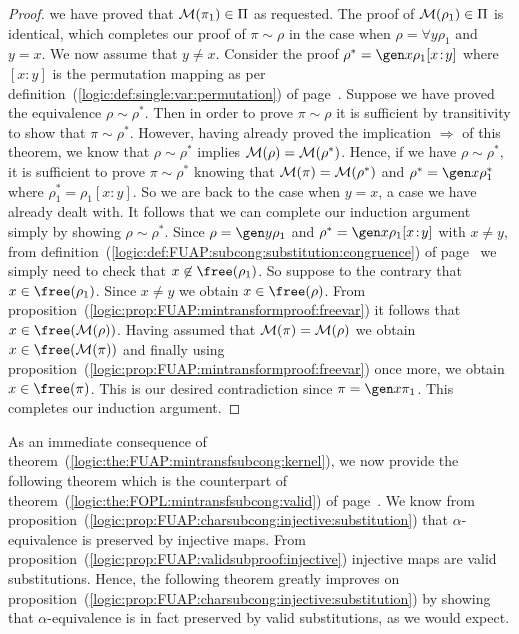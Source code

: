 \begin{proof}
we have proved that ${\cal M}(\pi_{1})\in\Pi$ as requested. The
proof of ${\cal M}(\rho_{1})\in\Pi$ is identical, which completes
our proof of $\pi\sim\rho$ in the case when $\rho=\forall y\rho_{1}$
and $y=x$. We now assume that $y\neq x$. Consider the proof
$\rho^{*}=\gen x\rho_{1}[x\!:\!y]$ where $[x\!:\!y]$ is the
permutation mapping as per
definition~(\ref{logic:def:single:var:permutation}) of
page~\pageref{logic:def:single:var:permutation}. Suppose we have
proved the equivalence $\rho\sim\rho^{*}$. Then in order to prove
$\pi\sim\rho$ it is sufficient by transitivity to show that
$\pi\sim\rho^{*}$. However, having already proved the implication
$\Rightarrow$ of this theorem, we know that $\rho\sim\rho^{*}$
implies ${\cal M}(\rho)={\cal M}(\rho^{*})$. Hence, if we have
$\rho\sim\rho^{*}$, it is sufficient to prove $\pi\sim\rho^{*}$
knowing that ${\cal M}(\pi)={\cal M}(\rho^{*})$ and $\rho^{*}=\gen
x\rho_{1}^{*}$ where $\rho_{1}^{*}=\rho_{1}[x\!:\!y]$. So we are
back to the case when $y=x$, a case we have already dealt with. It
follows that we can complete our induction argument simply by
showing $\rho\sim\rho^{*}$. Since $\rho=\gen y\rho_{1}$ and
$\rho^{*}=\gen x\rho_{1}[x\!:\!y]$ with $x\neq y$, from
definition~(\ref{logic:def:FUAP:subcong:substitution:congruence}) of
page~\pageref{logic:def:FUAP:subcong:substitution:congruence} we
simply need to check that $x\not\in\free(\rho_{1})$. So suppose to
the contrary that $x\in\free(\rho_{1})$. Since $x\neq y$ we obtain
$x\in\free(\rho)$. From
proposition~(\ref{logic:prop:FUAP:mintransformproof:freevar}) it
follows that $x\in\free({\cal M}(\rho))$. Having assumed that ${\cal
M}(\pi)={\cal M}(\rho)$ we obtain $x\in\free({\cal M}(\pi))$ and
finally using
proposition~(\ref{logic:prop:FUAP:mintransformproof:freevar}) once
more, we obtain $x\in\free(\pi)$. This is our desired contradiction
since $\pi=\gen x\pi_{1}$. This completes our induction argument.
\end{proof}

As an immediate consequence of
theorem~(\ref{logic:the:FUAP:mintransfsubcong:kernel}), we now
provide the following theorem which is the counterpart of
theorem~(\ref{logic:the:FOPL:mintransfsubcong:valid}) of
page~\pageref{logic:the:FOPL:mintransfsubcong:valid}. We know from
proposition~(\ref{logic:prop:FUAP:charsubcong:injective:substitution})
that $\alpha$-equivalence is preserved by injective maps. From
proposition~(\ref{logic:prop:FUAP:validsubproof:injective})
injective maps are valid substitutions. Hence, the following theorem
greatly improves on
proposition~(\ref{logic:prop:FUAP:charsubcong:injective:substitution})
by showing that $\alpha$-equivalence is in fact preserved by valid
substitutions, as we would expect.

